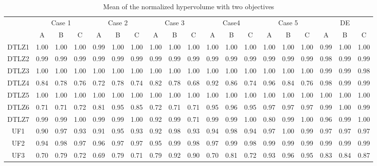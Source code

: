 \begin{table}[]
\centering
\caption{Mean of the normalized hypervolume with two objectives}
\label{my-label}
\begin{tabular}{c|c|c|c|c|c|c|c|c|c|c|c|c|c|c|c|c|c|c|}
\cline{2-19}
 & \multicolumn{3}{c|}{Case 1} & \multicolumn{3}{c|}{Case 2} & \multicolumn{3}{c|}{Case 3} & \multicolumn{3}{c|}{Case4} & \multicolumn{3}{c|}{Case 5} & \multicolumn{3}{c|}{DE} \\ \cline{2-19} 
 & A & B & C & A & B & C & A & B & C & A & B & C & A & B & C & A & B & C \\ \hline
\multicolumn{1}{|c|}{DTLZ1} & 1.00 & 1.00 & 1.00 & 0.99 & 1.00 & 1.00 & 1.00 & 1.00 & 1.00 & 1.00 & 1.00 & 1.00 & 1.00 & 1.00 & 1.00 & 0.99 & 1.00 & 1.00 \\ \hline
\multicolumn{1}{|c|}{DTLZ2} & 0.99 & 0.99 & 0.99 & 0.99 & 0.99 & 0.99 & 0.99 & 0.99 & 0.99 & 0.99 & 0.99 & 0.99 & 0.99 & 0.99 & 0.99 & 0.98 & 0.99 & 0.99 \\ \hline
\multicolumn{1}{|c|}{DTLZ3} & 1.00 & 1.00 & 1.00 & 1.00 & 1.00 & 1.00 & 1.00 & 1.00 & 1.00 & 1.00 & 1.00 & 1.00 & 1.00 & 1.00 & 1.00 & 0.99 & 0.99 & 0.98 \\ \hline
\multicolumn{1}{|c|}{DTLZ4} & 0.84 & 0.78 & 0.76 & 0.72 & 0.78 & 0.74 & 0.82 & 0.78 & 0.68 & 0.92 & 0.86 & 0.74 & 0.96 & 0.84 & 0.76 & 0.98 & 0.99 & 0.99 \\ \hline
\multicolumn{1}{|c|}{DTLZ5} & 1.00 & 1.00 & 1.00 & 1.00 & 1.00 & 1.00 & 1.00 & 1.00 & 1.00 & 1.00 & 1.00 & 1.00 & 1.00 & 1.00 & 1.00 & 1.00 & 1.00 & 1.00 \\ \hline
\multicolumn{1}{|c|}{DTLZ6} & 0.71 & 0.71 & 0.72 & 0.81 & 0.95 & 0.85 & 0.72 & 0.71 & 0.71 & 0.95 & 0.96 & 0.95 & 0.97 & 0.97 & 0.97 & 0.99 & 1.00 & 0.99 \\ \hline
\multicolumn{1}{|c|}{DTLZ7} & 0.99 & 0.99 & 1.00 & 0.99 & 0.99 & 1.00 & 0.92 & 0.99 & 0.71 & 0.99 & 0.99 & 1.00 & 0.80 & 0.99 & 1.00 & 0.96 & 0.99 & 1.00 \\ \hline
\multicolumn{1}{|c|}{UF1} & 0.90 & 0.97 & 0.93 & 0.91 & 0.95 & 0.93 & 0.92 & 0.98 & 0.93 & 0.94 & 0.98 & 0.94 & 0.97 & 1.00 & 0.99 & 0.97 & 0.97 & 0.97 \\ \hline
\multicolumn{1}{|c|}{UF2} & 0.94 & 0.98 & 0.97 & 0.96 & 0.97 & 0.97 & 0.95 & 0.99 & 0.98 & 0.97 & 0.99 & 0.98 & 0.99 & 0.99 & 0.99 & 0.99 & 0.99 & 0.99 \\ \hline
\multicolumn{1}{|c|}{UF3} & 0.70 & 0.79 & 0.72 & 0.69 & 0.79 & 0.71 & 0.79 & 0.92 & 0.90 & 0.70 & 0.81 & 0.72 & 0.93 & 0.96 & 0.95 & 0.83 & 0.84 & 0.87 \\ \hline

\end{tabular}
\end{table}
